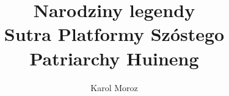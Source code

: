 \documentclass[12pt]{wzmgr}
\author{Karol Moroz}
\title{Narodziny legendy\\Sutra Platformy Szóstego Patriarchy Huineng}
\begin{document}
\onehalfspacing
\maketitle



\printindex

\end{document}
